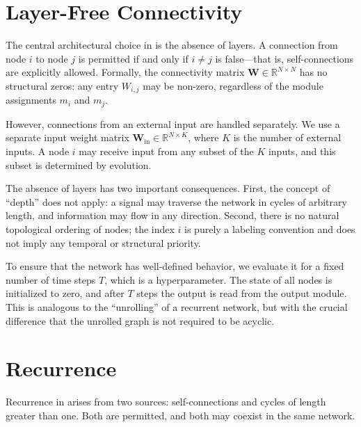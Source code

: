 \section{Layer-Free Connectivity}
\label{sec:layer-free}

The central architectural choice in \modnet{} is the absence of layers.
A connection from node $i$ to node $j$ is permitted if and only if
$i \neq j$ is false---that is, self-connections are explicitly allowed.
Formally, the connectivity matrix $\mathbf{W} \in \mathbb{R}^{N \times N}$
has no structural zeros: any entry $W_{i,j}$ may be non-zero,
regardless of the module assignments $m_i$ and $m_j$.

However, connections from an external input are handled separately.
We use a separate input weight matrix $\mathbf{W}_{\text{in}} \in
\mathbb{R}^{N \times K}$, where $K$ is the number of external inputs.
A node $i$ may receive input from any subset of the $K$ inputs, and
this subset is determined by evolution.

\begin{remark}
The absence of layers has two important consequences. First, the
concept of ``depth'' does not apply: a signal may traverse the network
in cycles of arbitrary length, and information may flow in any
direction. Second, there is no natural topological ordering of nodes;
the index $i$ is purely a labeling convention and does not imply any
temporal or structural priority.
\end{remark}

To ensure that the network has well-defined behavior, we evaluate it
for a fixed number of time steps $T$, which is a hyperparameter. The
state of all nodes is initialized to zero, and after $T$ steps the
output is read from the output module. This is analogous to the
``unrolling'' of a recurrent network, but with the crucial difference
that the unrolled graph is not required to be acyclic.

\section{Recurrence}
\label{sec:recurrence}

Recurrence in \modnet{} arises from two sources: self-connections and
cycles of length greater than one. Both are permitted, and both may
coexist in the same network.

